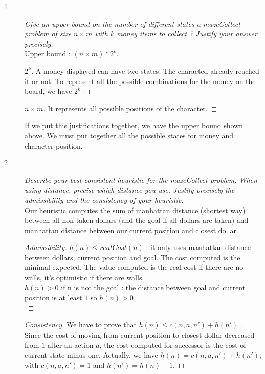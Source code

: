 \begin{description}
\item[1] \textit{ Give an upper bound on the number of different states a mazeCollect problem of size $n \times m$ with $k$ money items to collect ? Justify your answer precisely.}\\


Upper bound : $(n\times m) * 2^k$. 
\begin{proof}[$2^k$]
A money displayed can have two states. The characted already reached it or not. To represent all the possible combinations for the money on the board, we have $2^k$
\end{proof}
\begin{proof}[$n\times m$]
It represents all possible positions of the character.
\end{proof}
If we put this justifications together, we have the upper bound shown above. We must put together all the possible states for money and character position.


\item [2] \textit{Describe your best consistent heuristic for the mazeCollect problem. When using distance, precise which distance you use. Justify precisely the admissibility and the consistency of your heuristic.}\\

Our heuristic computes the sum of manhattan distance (shortest way) between all non-taken dollars (and the goal if all dollars are taken) and manhattan distance between our current position and closest dollar. 
\begin{proof}[Admissibility]
$h(n) \leq realCost(n)$ : it only uses manhattan distance between dollars, current position and goal. The cost computed is the minimal expected. The value computed is the real cost if there are no walls, it's optimistic if there are walls. \\
$h(n) > 0$ if n is not the goal : the distance between goal and current position is at least $1$ so $h(n) > 0$\\
\end{proof}
\begin{proof}[Consistency]

We have to prove that $h(n)\leq c(n,a,n') + h(n')$ . \\
Since the cost of moving from current position to closest dollar decreased from $1$ after an action $a$, the cost computed for successor is the cost of current state minus one. Actually, we have $h(n)= c(n,a,n') + h(n')$, with $ c(n,a,n')=1$ and $h(n')= h(n) - 1 $.


\end{proof}
\end{description}
